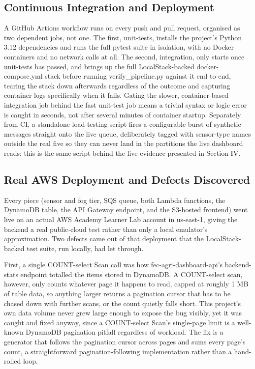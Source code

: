 \documentclass[conference]{IEEEtran}
\begin{document}
\subsection{Continuous Integration and Deployment}
A GitHub Actions workflow runs on every push and pull request, organised as two dependent jobs, not one. The first, unit-tests, installs the project's Python 3.12 dependencies and runs the full pytest suite in isolation, with no Docker containers and no network calls at all. The second, integration, only starts once unit-tests has passed, and brings up the full LocalStack-backed docker-compose.yml stack before running verify\_pipeline.py against it end to end, tearing the stack down afterwards regardless of the outcome and capturing container logs specifically when it fails. Gating the slower, container-based integration job behind the fast unit-test job means a trivial syntax or logic error is caught in seconds, not after several minutes of container startup. Separately from CI, a standalone load-testing script fires a configurable burst of synthetic messages straight onto the live queue, deliberately tagged with sensor-type names outside the real five so they can never land in the partitions the live dashboard reads; this is the same script behind the live evidence presented in Section IV.

\subsection{Real AWS Deployment and Defects Discovered}
Every piece (sensor and fog tier, SQS queue, both Lambda functions, the DynamoDB table, the API Gateway endpoint, and the S3-hosted frontend) went live on an actual AWS Academy Learner Lab account in us-east-1, giving the backend a real public-cloud test rather than only a local emulator's approximation. Two defects came out of that deployment that the LocalStack-backed test suite, run locally, had let through.

First, a single COUNT-select Scan call was how fec-agri-dashboard-api's backend-stats endpoint totalled the items stored in DynamoDB. A COUNT-select scan, however, only counts whatever page it happens to read, capped at roughly 1 MB of table data, so anything larger returns a pagination cursor that has to be chased down with further scans, or the count quietly falls short. This project's own data volume never grew large enough to expose the bug visibly, yet it was caught and fixed anyway, since a COUNT-select Scan's single-page limit is a well-known DynamoDB pagination pitfall regardless of workload. The fix is a generator that follows the pagination cursor across pages and sums every page's count, a straightforward pagination-following implementation rather than a hand-rolled loop.
\end{document}
